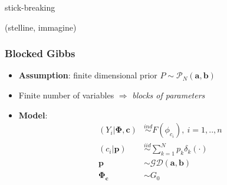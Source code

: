 \documentclass{beamer}
\begin{document}
\begin{frame}[c] %
	\begin{center}
stick-breaking
		
		(stelline, immagine)
		
	\end{center}
\end{frame}


\begin{frame} %
	\frametitle{Blocked Gibbs}
	\begin{itemize}
	    \item \textbf{Assumption}: finite dimensional prior  $P \sim  \mathscr{P}_{N}(\textbf{a},\textbf{b})$
	
        \item Finite number of variables $\Rightarrow$ \textit{blocks of parameters} \\
        \item \textbf{Model}:\\
        \begin{align*}
            (Y_{i}|\mathbf{\Phi},\mathbf{c})&\stackrel{ind}{\sim} F(\phi_{c_{i}}) , \ i=1,..,n \\
            (c_{i}|\mathbf{p})&\stackrel{iid}{\sim}\sum\limits_{k=1}^N \mathit{p_{k}}\delta_{k}(\cdot)\\
            \mathbf{p} &\sim \mathscr{GD}(\textbf{a},\textbf{b}) \\
            \mathbf{\Phi_{c}} & \sim G_{0}
        \end{align*}



	\end{itemize}
\end{frame}
\end{document}
